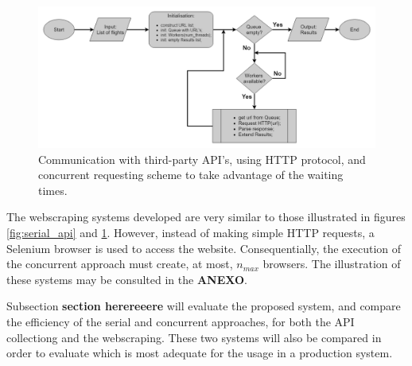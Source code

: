 \begin{figure}[htpb]
  \centering
  \includegraphics[width=\textwidth]{./Figures/system_implementation/concurrent_api.png}
  \caption{Communication with third-party API's, using HTTP protocol, and concurrent requesting scheme to take advantage of the waiting times.}
  \label{fig:concurrent_api}  
\end{figure}


The webscraping systems developed are very similar to those illustrated in figures \ref{fig:serial_api} and \ref{fig:concurrent_api}.
However, instead of making simple HTTP requests, a Selenium browser is used to access the website.
Consequentially, the execution of the concurrent approach must create, at most, $n_{max}$ browsers.
The illustration of these systems may be consulted in the \textbf{ANEXO}.

Subsection \textbf{section herereeere} will evaluate the proposed system,
and compare the efficiency of the serial and concurrent approaches,
for both the API collectiong and the webscraping. These two systems will also be compared 
in order to evaluate which is most adequate for the usage in a production system.



